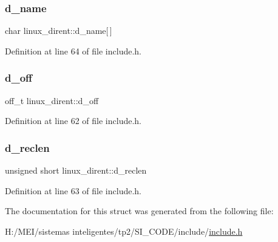 \mbox{\label{structlinux__dirent_a7e12cde71271d11545975d19b13200fa}} 
\subsubsection{\texorpdfstring{d\+\_\+name}{d\_name}}
{\footnotesize\ttfamily char linux\+\_\+dirent\+::d\+\_\+name\mbox{[}$\,$\mbox{]}}



Definition at line 64 of file include.\+h.

\mbox{\label{structlinux__dirent_a8c685abf351d3f31a8dd119e4a775078}} 
\subsubsection{\texorpdfstring{d\+\_\+off}{d\_off}}
{\footnotesize\ttfamily off\+\_\+t linux\+\_\+dirent\+::d\+\_\+off}



Definition at line 62 of file include.\+h.

\mbox{\label{structlinux__dirent_a42ba867e75bb4fbf7cae374bc58ee91a}} 
\subsubsection{\texorpdfstring{d\+\_\+reclen}{d\_reclen}}
{\footnotesize\ttfamily unsigned short linux\+\_\+dirent\+::d\+\_\+reclen}



Definition at line 63 of file include.\+h.



The documentation for this struct was generated from the following file\+:\begin{DoxyCompactItemize}
\item 
H\+:/\+M\+E\+I/sistemas inteligentes/tp2/\+S\+I\+\_\+\+C\+O\+D\+E/include/\hyperlink{include_8h}{include.\+h}\end{DoxyCompactItemize}
